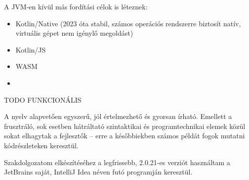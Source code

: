 A JVM-en kívül más fordítási célok is léteznek:
\begin{itemize}
    \item Kotlin/Native (2023 óta stabil, számos operációs rendszerre biztosít natív, virtuális gépet nem igénylő megoldást)
    \item Kotlin/JS
    \item WASM
    \item 
\end{itemize}

TODO FUNKCIONÁLIS

A nyelv alapvetően egyszerű, jól értelmezhető és gyorsan írható. Emellett a frusztráló, sok esetben hátráltató szintaktikai és programtechnikai elemek közül sokat elhagytak a fejlesztők -- erre a későbbiekben számos példát fogok mutatni kódrészleteken keresztül.

Szakdolgozatom elkészítéséhez a legfrissebb, 2.0.21-es verziót használtam a JetBrains saját, IntelliJ Idea néven futó programján keresztül.
